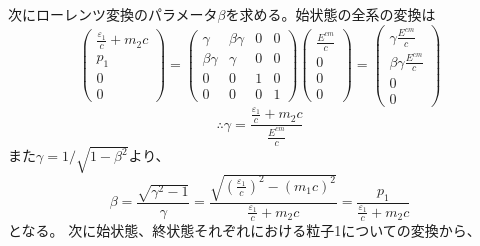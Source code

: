 \documentclass[a4paper,11pt,dvipdfmx]{jsarticle}
\begin{document}
次にローレンツ変換のパラメータ$\beta$を求める。始状態の全系の変換は
\begin{equation}
    \left(
    \begin{array}{c}
     \frac{\varepsilon_{1}}{c} +m_{2}c \\
      p_{1}\\
      0 \\
      0
    \end{array}
  \right)  = \left(
    \begin{array}{cccc}
      \gamma & \beta\gamma & 0 & 0 \\
      \beta\gamma & \gamma & 0 & 0 \\
      0 & 0 & 1 & 0 \\
      0 & 0 & 0 & 1
    \end{array}
    \right) 
      \left(
    \begin{array}{c}
     \frac{E^{cm}}{c}  \\
      0\\
      0\\
      0
    \end{array}
  \right) =
    \left(
    \begin{array}{c}
     \gamma\frac{E^{cm}}{c}  \\
      \beta\gamma\frac{E^{cm}}{c}\\
      0\\
      0
    \end{array}
  \right) 
\end{equation}
\begin{equation}
    \therefore \gamma=\frac{\frac{\varepsilon_{1}}{c} +m_{2}c}{\frac{E^{cm}}{c}}
\end{equation}
また\;$\gamma=1/\sqrt{1-\beta^2}$より、
\begin{equation}
    \beta=\frac{\sqrt{\gamma^{2}-1}}{\gamma}=\frac{\sqrt{\left(\frac{\varepsilon_{1}}{c}\right)^2-(m_{1}c)^2}}{\frac{\varepsilon_{1}}{c} +m_{2}c}=\frac{p_{1}}{\frac{\varepsilon_{1}}{c} +m_{2}c}
\end{equation}
となる。
次に始状態、終状態それぞれにおける粒子1についての変換から、
\end{document}
